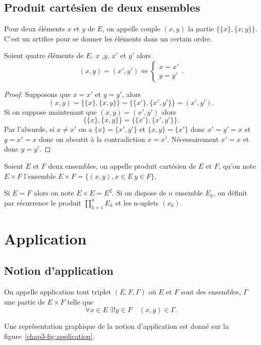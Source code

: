 \subsection{Produit cartésien de deux ensembles}
\label{chap3-subsec:prodcart}
\begin{defdef}
  Pour deux éléments $x$ et $y$ de $E$, on appelle couple $(x,y)$ la partie $\{\{x\},\{x;y\}\}$. C'est un artifice pour se donner les éléments dans un certain ordre.
\end{defdef}
%
\begin{prop}
  Soient quatre éléments de $E$, $x$ ,$y$, $x'$ et $y'$ alors 
  \begin{equation} 
    (x,y)=(x',y') \iff \begin{cases} x=x' \\ y=y' \end{cases}.
  \end{equation}
\end{prop}
\begin{proof}
Supposons que $x=x'$ et $y=y'$, alors 
\begin{equation}
  (x,y)=\{\{x\},\{x,y\}\}=\{\{x'\},\{x',y'\}\}=(x',y').
\end{equation}
Si on suppose maintenant que $(x,y)=(x',y')$ alors 
\begin{equation}
  \{\{x\},\{x,y\}\}=\{\{x'\},\{x',y'\}\}.
\end{equation}
Par l'absurde, si $x \neq x'$ on a $\{x\}=\{x',y'\}$ et $\{x,y\} = \{x'\}$ donc $x'=y'=x$ et $y=x'=x$ donc on aboutit à la contradiction $x=x'$. Nécessairement $x'=x$ et donc $y=y'$.
\end{proof}
%
\begin{defdef}
  Soient $E$ et $F$ deux ensembles, on appelle produit cartésien de $E$ et $F$, qu'on note $E \times F$ l'ensemble $E \times F = \{(x,y), x \in E \ y\in F\}$.
\end{defdef}
Si $E=F$ alors on note $E \times E=E^2$. Si on dispose de $n$ ensemble $E_k$, on définit par récurrence le produit $\prod_{k=1}^n E_k$ et les n-uplets $(x_k)$.

\section{Application}
\label{chap3-sec:applications}
\subsection{Notion d'application}
\label{chap3-subsec:notiondapplication}
\begin{defdef}
  On appelle application tout triplet $(E,F,\Gamma)$ où $E$ et $F$ sont des ensembles, $\Gamma$ une partie de $E \times F$ telle que 
  \begin{equation}
    \forall x \in E \ \exists! y \in F \quad (x,y) \in \Gamma.
  \end{equation}
\end{defdef}
Une représentation graphique de la notion d'application est donné sur la figure~\ref{chap3-fig:application}.

